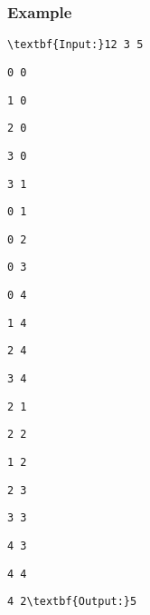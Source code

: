 \subsubsection{Example}
\begin{verbatim}
\textbf{Input:}12 3 5 \end{verbatim}
\begin{verbatim}
0 0 \end{verbatim}
\begin{verbatim}
1 0 \end{verbatim}
\begin{verbatim}
2 0 \end{verbatim}
\begin{verbatim}
3 0 \end{verbatim}
\begin{verbatim}
3 1 \end{verbatim}
\begin{verbatim}
0 1 \end{verbatim}
\begin{verbatim}
0 2 \end{verbatim}
\begin{verbatim}
0 3 \end{verbatim}
\begin{verbatim}
0 4 \end{verbatim}
\begin{verbatim}
1 4 \end{verbatim}
\begin{verbatim}
2 4 \end{verbatim}
\begin{verbatim}
3 4 \end{verbatim}
\begin{verbatim}
2 1 \end{verbatim}
\begin{verbatim}
2 2 \end{verbatim}
\begin{verbatim}
1 2 \end{verbatim}
\begin{verbatim}
2 3 \end{verbatim}
\begin{verbatim}
3 3 \end{verbatim}
\begin{verbatim}
4 3 \end{verbatim}
\begin{verbatim}
4 4 \end{verbatim}
\begin{verbatim}
4 2\textbf{Output:}5\end{verbatim}
